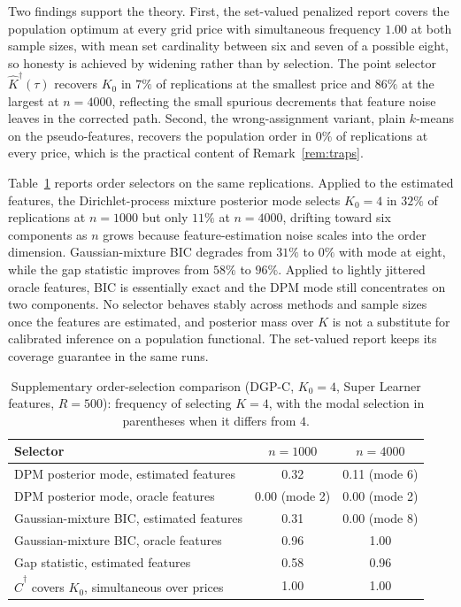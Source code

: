 \documentclass[11pt]{article}
\begin{document}
Two findings support the theory. First, the set-valued penalized report covers the population optimum at every grid price with simultaneous frequency $1.00$ at both sample sizes, with mean set cardinality between six and seven of a possible eight, so honesty is achieved by widening rather than by selection. The point selector $\widehat K^\dagger(\tau)$ recovers $K_0$ in $7\%$ of replications at the smallest price and $86\%$ at the largest at $n=4000$, reflecting the small spurious decrements that feature noise leaves in the corrected path. Second, the wrong-assignment variant, plain $k$-means on the pseudo-features, recovers the population order in $0\%$ of replications at every price, which is the practical content of Remark~\ref{rem:traps}.

Table~\ref{tab:sims:comparators} reports order selectors on the same replications. Applied to the estimated features, the Dirichlet-process mixture posterior mode selects $K_0=4$ in $32\%$ of replications at $n=1000$ but only $11\%$ at $n=4000$, drifting toward six components as $n$ grows because feature-estimation noise scales into the order dimension. Gaussian-mixture BIC degrades from $31\%$ to $0\%$ with mode at eight, while the gap statistic improves from $58\%$ to $96\%$. Applied to lightly jittered oracle features, BIC is essentially exact and the DPM mode still concentrates on two components. No selector behaves stably across methods and sample sizes once the features are estimated, and posterior mass over $K$ is not a substitute for calibrated inference on a population functional. The set-valued report keeps its coverage guarantee in the same runs.

\begin{table}[t]
\centering
\caption{Supplementary order-selection comparison (DGP-C, $K_0=4$, Super Learner features, $R=500$): frequency of selecting $K=4$, with the modal selection in parentheses when it differs from $4$.}
\label{tab:sims:comparators}
\begin{tabular}{l cc}
\toprule
Selector & $n=1000$ & $n=4000$\\
\midrule
DPM posterior mode, estimated features & 0.32 & 0.11 (mode 6)\\
DPM posterior mode, oracle features & 0.00 (mode 2) & 0.00 (mode 2)\\
Gaussian-mixture BIC, estimated features & 0.31 & 0.00 (mode 8)\\
Gaussian-mixture BIC, oracle features & 0.96 & 1.00\\
Gap statistic, estimated features & 0.58 & 0.96\\
$\widehat C^\dagger$ covers $K_0$, simultaneous over prices & 1.00 & 1.00\\
\bottomrule
\end{tabular}
\end{table}
\end{document}

